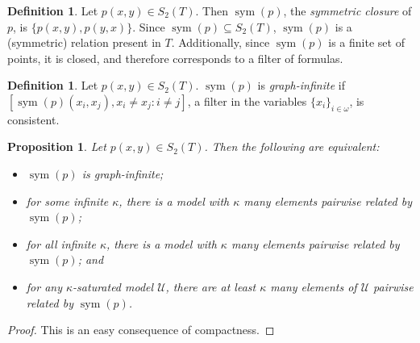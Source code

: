 \documentclass[letterpaper,twoside]{article}
\newtheorem{proposition}[theorem]{Proposition}
\theoremstyle{definition}
\newtheorem{definition}[theorem]{Definition}
\theoremstyle{remark}
\newcommand{\defterm}[1]{\emph{#1}}
\DeclareMathOperator{\sym}{sym}
\begin{document}
\begin{definition}
  Let \(p(x,y) \in S_2(T)\).  Then \(\sym(p)\), the \defterm{symmetric
    closure} of \(p\), is \(\{p(x,y), p(y,x)\}\).  Since \(\sym(p)
  \subseteq S_2(T)\), \(\sym(p)\) is a (symmetric) relation present in
  \(T\).  Additionally, since \(\sym(p)\) is a finite set of points,
  it is closed, and therefore corresponds to a filter of formulas.
\end{definition}

\begin{definition}
  Let \(p(x,y) \in S_2(T)\).  \(\sym(p)\) is \defterm{graph-infinite}
  if \([\sym(p)(x_i,x_j), x_i \neq x_j : i \neq j]\), a filter in the
  variables \(\{x_i\}_{i \in \omega}\), is consistent.
\end{definition}

\begin{proposition}
  Let \(p(x,y) \in S_2(T)\).  Then the following are equivalent:
  \begin{itemize}
  \item \(\sym(p)\) is graph-infinite;
  \item for some infinite \(\kappa\), there is a model with \(\kappa\)
    many elements pairwise related by \(\sym(p)\);
  \item for all infinite \(\kappa\), there is a model with \(\kappa\)
    many elements pairwise related by \(\sym(p)\); and
  \item for any \(\kappa\)-saturated model \(\mathcal{U}\), there are
    at least \(\kappa\) many elements of \(\mathcal{U}\) pairwise
    related by \(\sym(p)\).
  \end{itemize}
\end{proposition}
\begin{proof}
  This is an easy consequence of compactness.
\end{proof}
\end{document}
